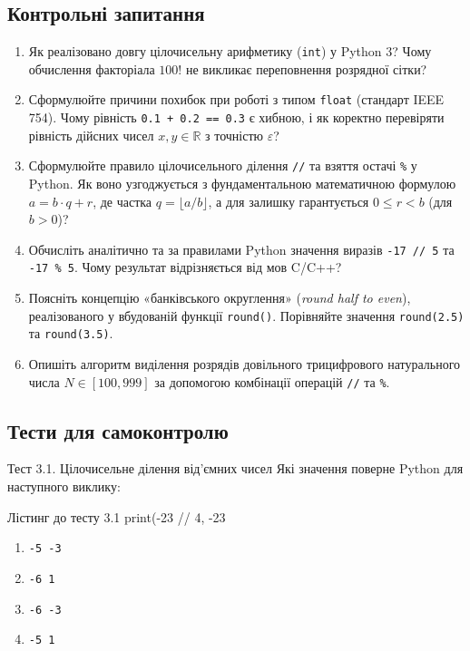\subsection*{Контрольні запитання}
\begin{enumerate}[label=\textbf{3.\arabic*.}]
	\item Як реалізовано довгу цілочисельну арифметику (\texttt{int}) у Python 3? Чому обчислення факторіала $100!$ не викликає переповнення розрядної сітки?
	\item Сформулюйте причини похибок при роботі з типом \texttt{float} (стандарт IEEE 754). Чому рівність \texttt{0.1 + 0.2 == 0.3} є хибною, і як коректно перевіряти рівність дійсних чисел $x, y \in \mathbb{R}$ з точністю $\varepsilon$?
	\item Сформулюйте правило цілочисельного ділення \texttt{//} та взяття остачі \texttt{\%} у Python. Як воно узгоджується з фундаментальною математичною формулою $a = b \cdot q + r$, де частка $q = \lfloor a/b \rfloor$, а для залишку гарантується $0 \le r < b$ (для $b > 0$)?
	\item Обчисліть аналітично та за правилами Python значення виразів \texttt{-17 // 5} та \texttt{-17 \% 5}. Чому результат відрізняється від мов C/C++?
	\item Поясніть концепцію «банківського округлення» (\textit{round half to even}), реалізованого у вбудованій функції \texttt{round()}. Порівняйте значення \texttt{round(2.5)} та \texttt{round(3.5)}.
	\item Опишіть алгоритм виділення розрядів довільного трицифрового натурального числа $N \in [100, 999]$ за допомогою комбінації операцій \texttt{//} та \texttt{\%}.
\end{enumerate}

\subsection*{Тести для самоконтролю}

\begin{pr}{Тест 3.1. Цілочисельне ділення від'ємних чисел}
Які значення поверне Python для наступного виклику:
\begin{py}{Лістинг до тесту 3.1}
print(-23 // 4, -23 %
\end{py}
\begin{enumerate}[label=\textbf{\Alph*.}]
	\item \texttt{-5 -3}
	\item \texttt{-6 1}
	\item \texttt{-6 -3}
	\item \texttt{-5 1}
\end{enumerate}
\end{pr}

